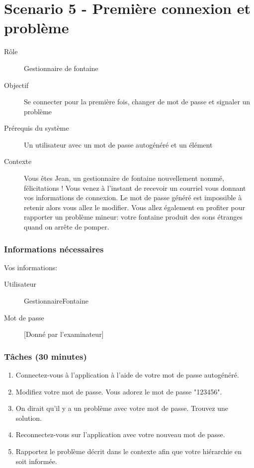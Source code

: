 \documentclass[a4paper, 11pt]{article}
\begin{document}
\section*{Scenario 5 - Première connexion et problème}
    \begin{description}
        \item[Rôle] Gestionnaire de fontaine
        \item[Objectif] Se connecter pour la première fois, changer de mot de passe et signaler un problème
        \item[Prérequis du système] Un utilisateur avec un mot de passe autogénéré et un élément
        \item[Contexte] Vous êtes Jean, un gestionnaire de fontaine nouvellement nommé, félicitations ! Vous venez à l'instant de recevoir un courriel vous donnant vos informations de connexion. Le mot de passe généré est impossible à retenir alors vous allez le modifier. Vous allez également en profiter pour rapporter un problème mineur: votre fontaine produit des sons étranges quand on arrête de pomper.
    \end{description}

    \subsubsection*{Informations nécessaires}
    Vos informations:
    \begin{description}
        \item[Utilisateur] GestionnaireFontaine
        \item[Mot de passe] [Donné par l'examinateur]
    \end{description}

    \subsubsection*{Tâches (30 minutes)}
        \begin{enumerate}
            \item Connectez-vous à l'application à l'aide de votre mot de passe autogénéré.
            \item Modifiez votre mot de passe. Vous adorez le mot de passe "123456".
            \item On dirait qu'il y a un problème avec votre mot de passe. Trouvez une solution.
            \item Reconnectez-vous sur l'application avec votre nouveau mot de passe.
            \item Rapportez le problème décrit dans le contexte afin que votre hiérarchie en soit informée.
        \end{enumerate}
\end{document}
